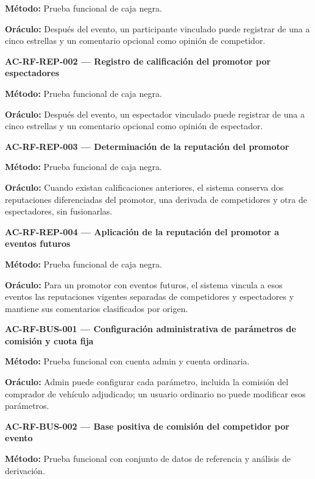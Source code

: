 \documentclass[10pt,letterpaper]{article}
\begin{document}
\textbf{Método:} Prueba funcional de caja negra.\par
\textbf{Oráculo:} Después del evento, un participante vinculado puede registrar de una a cinco estrellas y un comentario opcional como opinión de competidor.\par\vspace{0.45em}
\noindent\textbf{AC-RF-REP-002 --- Registro de calificación del promotor por espectadores}\par
\textbf{Método:} Prueba funcional de caja negra.\par
\textbf{Oráculo:} Después del evento, un espectador vinculado puede registrar de una a cinco estrellas y un comentario opcional como opinión de espectador.\par\vspace{0.45em}
\noindent\textbf{AC-RF-REP-003 --- Determinación de la reputación del promotor}\par
\textbf{Método:} Prueba funcional de caja negra.\par
\textbf{Oráculo:} Cuando existan calificaciones anteriores, el sistema conserva dos reputaciones diferenciadas del promotor, una derivada de competidores y otra de espectadores, sin fusionarlas.\par\vspace{0.45em}
\noindent\textbf{AC-RF-REP-004 --- Aplicación de la reputación del promotor a eventos futuros}\par
\textbf{Método:} Prueba funcional de caja negra.\par
\textbf{Oráculo:} Para un promotor con eventos futuros, el sistema vincula a esos eventos las reputaciones vigentes separadas de competidores y espectadores y mantiene sus comentarios clasificados por origen.\par\vspace{0.45em}
\noindent\textbf{AC-RF-BUS-001 --- Configuración administrativa de parámetros de comisión y cuota fija}\par
\textbf{Método:} Prueba funcional con cuenta admin y cuenta ordinaria.\par
\textbf{Oráculo:} Admin puede configurar cada parámetro, incluida la comisión del comprador de vehículo adjudicado; un usuario ordinario no puede modificar esos parámetros.\par\vspace{0.45em}
\noindent\textbf{AC-RF-BUS-002 --- Base positiva de comisión del competidor por evento}\par
\textbf{Método:} Prueba funcional con conjunto de datos de referencia y análisis de derivación.\par
\end{document}
